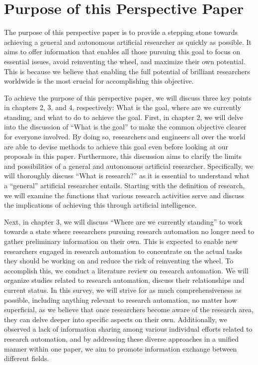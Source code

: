 \section{Purpose of this Perspective Paper}
The purpose of this perspective paper is to provide a stepping stone towards achieving a general and autonomous artificial researcher as quickly as possible. It aims to offer information that enables all those pursuing this goal to focus on essential issues, avoid reinventing the wheel, and maximize their own potential. This is because we believe that enabling the full potential of brilliant researchers worldwide is the most crucial for accomplishing this objective.

To achieve the purpose of this perspective paper, we will discuss three key points in chapters 2, 3, and 4, respectively: What is the goal, where are we currently standing, and what to do to achieve the goal. First, in chapter 2, we will delve into the discussion of ``What is the goal'' to make the common objective clearer for everyone involved. By doing so, researchers and engineers all over the world are able to devise methods to achieve this goal even before looking at our proposals in this paper. Furthermore, this discussion aims to clarify the limits and possibilities of a general and autonomous artificial researcher. Specifically, we will thoroughly discuss ``What is research?'' as it is essential to understand what a ``general'' artificial researcher entails. Starting with the definition of research, we will examine the functions that various research activities serve and discuss the implications of achieving this through artificial intelligence.

Next, in chapter 3, we will discuss ``Where are we currently standing'' to work towards a state where researchers pursuing research automation no longer need to gather preliminary information on their own. This is expected to enable new researchers engaged in research automation to concentrate on the actual tasks they should be working on and reduce the risk of reinventing the wheel. To accomplish this, we conduct a literature review on research automation. We will organize studies related to research automation, discuss their relationships and current status. In this survey, we will strive for as much comprehensiveness as possible, including anything relevant to research automation, no matter how superficial, as we believe that once researchers become aware of the research area, they can delve deeper into specific aspects on their own. Additionally, we observed a lack of information sharing among various individual efforts related to research automation, and by addressing these diverse approaches in a unified manner within one paper, we aim to promote information exchange between different fields.

